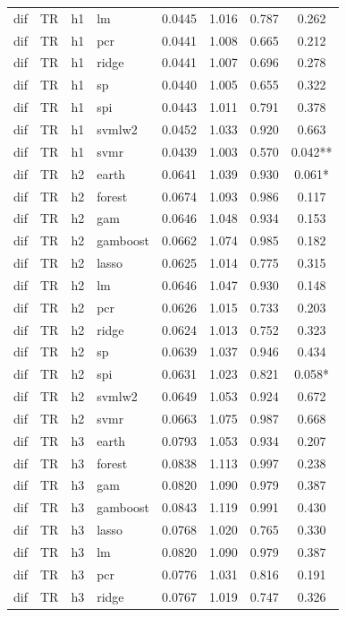 \begin{ThreePartTable}
\begin{longtable}[t]{llclcccc}
dif & TR & h1 & lm & 0.0445 & 1.016 & 0.787 & 0.262\\
dif & TR & h1 & pcr & 0.0441 & 1.008 & 0.665 & 0.212\\
dif & TR & h1 & ridge & 0.0441 & 1.007 & 0.696 & 0.278\\
dif & TR & h1 & sp & 0.0440 & 1.005 & 0.655 & 0.322\\
dif & TR & h1 & spi & 0.0443 & 1.011 & 0.791 & 0.378\\
dif & TR & h1 & svmlw2 & 0.0452 & 1.033 & 0.920 & 0.663\\
dif & TR & h1 & svmr & 0.0439 & 1.003 & 0.570 & 0.042**\\
\addlinespace
dif & TR & h2 & earth & 0.0641 & 1.039 & 0.930 & 0.061*\\
dif & TR & h2 & forest & 0.0674 & 1.093 & 0.986 & 0.117\\
dif & TR & h2 & gam & 0.0646 & 1.048 & 0.934 & 0.153\\
dif & TR & h2 & gamboost & 0.0662 & 1.074 & 0.985 & 0.182\\
dif & TR & h2 & lasso & 0.0625 & 1.014 & 0.775 & 0.315\\
dif & TR & h2 & lm & 0.0646 & 1.047 & 0.930 & 0.148\\
dif & TR & h2 & pcr & 0.0626 & 1.015 & 0.733 & 0.203\\
dif & TR & h2 & ridge & 0.0624 & 1.013 & 0.752 & 0.323\\
dif & TR & h2 & sp & 0.0639 & 1.037 & 0.946 & 0.434\\
dif & TR & h2 & spi & 0.0631 & 1.023 & 0.821 & 0.058*\\
dif & TR & h2 & svmlw2 & 0.0649 & 1.053 & 0.924 & 0.672\\
dif & TR & h2 & svmr & 0.0663 & 1.075 & 0.987 & 0.668\\
\addlinespace
dif & TR & h3 & earth & 0.0793 & 1.053 & 0.934 & 0.207\\
dif & TR & h3 & forest & 0.0838 & 1.113 & 0.997 & 0.238\\
dif & TR & h3 & gam & 0.0820 & 1.090 & 0.979 & 0.387\\
dif & TR & h3 & gamboost & 0.0843 & 1.119 & 0.991 & 0.430\\
dif & TR & h3 & lasso & 0.0768 & 1.020 & 0.765 & 0.330\\
dif & TR & h3 & lm & 0.0820 & 1.090 & 0.979 & 0.387\\
dif & TR & h3 & pcr & 0.0776 & 1.031 & 0.816 & 0.191\\
dif & TR & h3 & ridge & 0.0767 & 1.019 & 0.747 & 0.326\\

\end{longtable}
\end{ThreePartTable}
